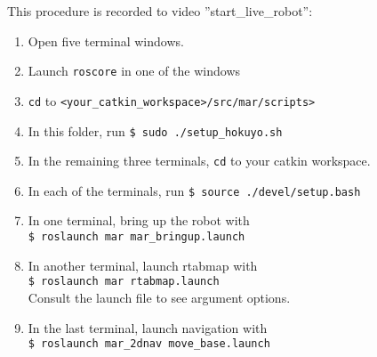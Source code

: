 This procedure is recorded to video ''start\_live\_robot'': 

\begin{enumerate}
	\item Open five terminal windows.
	\item Launch \texttt{roscore} in one of the windows
	\item \texttt{cd} to \texttt{<your\_catkin\_workspace>/src/mar/scripts>}
	\item In this folder, run \texttt{\$ sudo ./setup\_hokuyo.sh}
	\item In the remaining three terminals, \texttt{cd} to your catkin workspace.
	\item In each of the terminals, run \texttt{\$ source ./devel/setup.bash}
	\item In one terminal, bring up the robot with\\ \texttt{\$ roslaunch mar mar\_bringup.launch}
	\item In another terminal, launch rtabmap with\\ \texttt{\$ roslaunch mar rtabmap.launch}\\
	Consult the launch file to see argument options.
	\item In the last terminal, launch navigation with\\ \texttt{\$ roslaunch mar\_2dnav move\_base.launch}
\end{enumerate}
